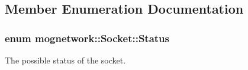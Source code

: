 \subsection{Member Enumeration Documentation}
\hypertarget{classmognetwork_1_1_socket_aa187a8394ac0d6203af0ec7f021ca15f}{
\subsubsection[{Status}]{\setlength{\rightskip}{0pt plus 5cm}enum {\bf mognetwork\-::\-Socket\-::\-Status}}}\label{classmognetwork_1_1_socket_aa187a8394ac0d6203af0ec7f021ca15f}


The possible status of the socket. 

